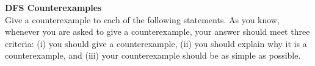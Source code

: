 \textbf{DFS Counterexamples} \\
Give a counterexample to each of the following statements. As you know, whenever you are asked to
give a counterexample, your answer should meet three criteria: (i) you should give a counterexample,
(ii) you should explain why it is a counterexample, and (iii) your counterexample should be as simple
as possible. \\


\begin{center}
    \end{center}
    

